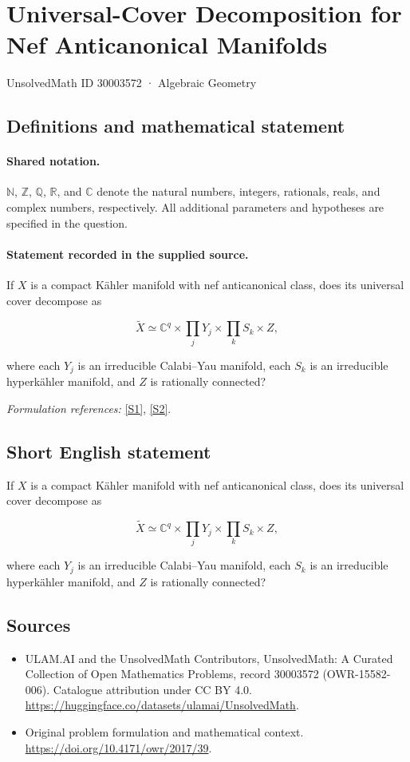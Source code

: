 \documentclass[11pt]{article}
\newcommand{\sref}[2]{\hyperlink{source:#1:#2}{[S#2]}}
\begin{document}
\setcounter{section}{30003571}
\section{Universal-Cover Decomposition for Nef Anticanonical Manifolds}\label{30003572}
{\small UnsolvedMath ID 30003572 · Algebraic Geometry}
\subsection{Definitions and mathematical statement}

\paragraph{Shared notation.}$\mathbb N$, $\mathbb Z$, $\mathbb Q$, $\mathbb R$, and $\mathbb C$ denote the natural numbers, integers, rationals, reals, and complex numbers, respectively. All additional parameters and hypotheses are specified in the question.


\paragraph{Statement recorded in the supplied source.}
If $X$ is a compact Kähler manifold with nef anticanonical class, does its universal cover decompose as

$$\widetilde X\simeq\mathbb C^q\times\prod_jY_j\times\prod_kS_k\times Z,$$

where each $Y_j$ is an irreducible Calabi–Yau manifold, each $S_k$ is an irreducible hyperkähler manifold, and $Z$ is rationally connected?
\par\smallskip\textit{Formulation references:} \sref{30003572}{1}, \sref{30003572}{2}.
\subsection{Short English statement}
If $X$ is a compact Kähler manifold with nef anticanonical class, does its universal cover decompose as

$$\widetilde X\simeq\mathbb C^q\times\prod_jY_j\times\prod_kS_k\times Z,$$

where each $Y_j$ is an irreducible Calabi–Yau manifold, each $S_k$ is an irreducible hyperkähler manifold, and $Z$ is rationally connected?
\subsection{Sources}
\begin{itemize}
\item[\hypertarget{source:30003572:1}{S1}] ULAM.AI and the UnsolvedMath Contributors, UnsolvedMath: A Curated Collection of Open Mathematics Problems, record 30003572 (OWR-15582-006). Catalogue attribution under CC BY 4.0.
\url{https://huggingface.co/datasets/ulamai/UnsolvedMath}.
\item[\hypertarget{source:30003572:2}{S2}] Original problem formulation and mathematical context.
\url{https://doi.org/10.4171/owr/2017/39}.
\end{itemize}
\label{end:30003572}
\end{document}
